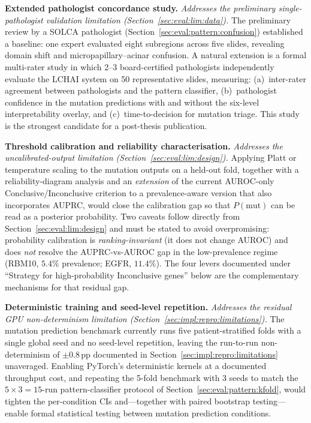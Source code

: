 \textbf{Extended pathologist concordance study.}
\emph{Addresses the preliminary single-pathologist validation
limitation (Section~\ref{sec:eval:lim:data}).}
The preliminary review by a SOLCA pathologist
(Section~\ref{sec:eval:pattern:confusion}) established a baseline:
one expert evaluated eight subregions across five slides, revealing
domain shift and micropapillary--acinar confusion.
A natural extension is a formal multi-rater study in which 2--3
board-certified pathologists independently evaluate the LCHAI system
on 50 representative slides, measuring: (a)~inter-rater agreement
between pathologists and the pattern classifier, (b)~pathologist
confidence in the mutation predictions with and without the
six-level interpretability overlay, and (c)~time-to-decision for
mutation triage.
This study is the strongest candidate for a post-thesis publication.

\textbf{Threshold calibration and reliability characterisation.}
\emph{Addresses the uncalibrated-output limitation
(Section~\ref{sec:eval:lim:design}).}
Applying Platt or temperature scaling to the mutation outputs on a
held-out fold, together with a reliability-diagram analysis and an
\emph{extension} of the current AUROC-only Conclusive/Inconclusive
criterion to a prevalence-aware version that also incorporates
AUPRC, would close the calibration gap so that $P(\text{mut})$
can be read as a posterior probability.
Two caveats follow directly from
Section~\ref{sec:eval:lim:design} and must be stated to avoid
overpromising: probability calibration is \emph{ranking-invariant}
(it does not change AUROC) and does \emph{not} resolve the
AUPRC-vs-AUROC gap in the low-prevalence regime
(RBM10, $5.4\%$ prevalence; EGFR, $11.4\%$).
The four levers documented under ``Strategy for high-probability
Inconclusive genes'' below are the complementary mechanisms for
that residual gap.

\textbf{Deterministic training and seed-level repetition.}
\emph{Addresses the residual GPU non-determinism limitation
(Section~\ref{sec:impl:repro:limitations}).}
The mutation prediction benchmark currently runs five
patient-stratified folds with a single global seed and no
seed-level repetition, leaving the run-to-run non-determinism
of $\pm 0.8$\,pp documented in
Section~\ref{sec:impl:repro:limitations} unaveraged.
Enabling PyTorch's deterministic kernels at a documented
throughput cost, and repeating the 5-fold benchmark with 3 seeds
to match the $5 \times 3 = 15$-run pattern-classifier protocol of
Section~\ref{sec:eval:pattern:kfold}, would tighten the
per-condition CIs and---together with paired bootstrap
testing---enable formal statistical testing between mutation
prediction conditions.

